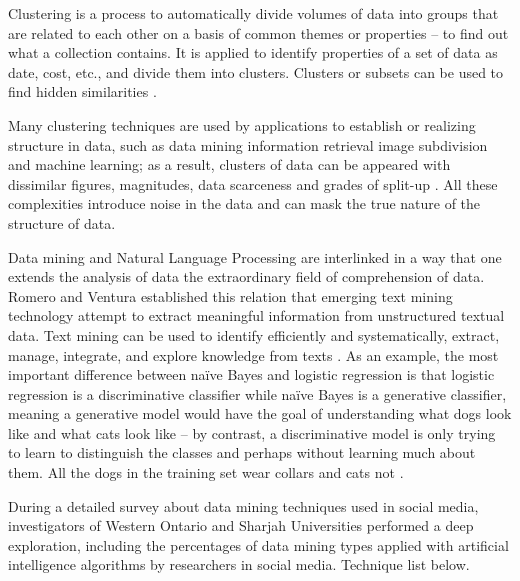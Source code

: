 \documentclass[runningheads]{llncs}
\begin{document}
Clustering is a process to automatically divide volumes of data into groups that are related to each other on a basis of common themes or properties – to find out what a collection contains. It is applied to identify properties of a set of data as date, cost, etc., and divide them into clusters. Clusters or subsets can be used to find hidden similarities \cite{Kendi2018SocialMM}.

Many clustering techniques are used by applications to establish or realizing structure in data, such as data mining information retrieval image subdivision and machine learning; as a result, clusters of data can be appeared with dissimilar figures, magnitudes, data scarceness and grades of split-up \cite{Tappe2016AnalysisAD}. All these complexities introduce noise in the data and can mask the true nature of the structure of data.

Data mining and Natural Language Processing are interlinked in a way that one extends the analysis of data the extraordinary field of comprehension of data. Romero and Ventura established this relation that emerging text mining technology attempt to extract meaningful information from unstructured textual data. Text mining can be used to identify efficiently and systematically, extract, manage, integrate, and explore knowledge from texts \cite{Kendi2018SocialMM} \cite{article}. As an example, the most important difference between naïve Bayes and logistic regression is that logistic regression is a discriminative classifier while naïve Bayes is a generative classifier, meaning a generative model would have the goal of understanding what dogs look like and what cats look like – by contrast, a discriminative model is only trying to learn to distinguish the classes and perhaps without learning much about them. All the dogs in the training set wear collars and cats not \cite{INJADAT2016654}.

During a detailed survey about data mining techniques used in social media, investigators of Western Ontario and Sharjah Universities performed a deep exploration, including the percentages of data mining types applied with artificial intelligence algorithms by researchers in social media. Technique list below.
\end{document}
